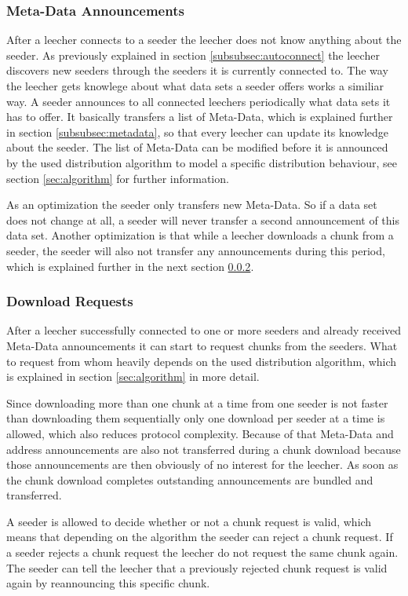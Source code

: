 \subsubsection{Meta-Data Announcements}
After a leecher connects to a seeder the leecher does not know anything about the seeder. As previously explained in section \ref{subsubsec:autoconnect} the leecher discovers new seeders through the seeders it is currently connected to. The way the leecher gets knowlege about what data sets a seeder offers works a similiar way. A seeder announces to all connected leechers periodically what data sets it has to offer. It basically transfers a list of Meta-Data, which is explained further in section \ref{subsubsec:metadata}, so that every leecher can update its knowledge about the seeder. The list of Meta-Data can be modified before it is announced by the used distribution algorithm to model a specific distribution behaviour, see section \ref{sec:algorithm} for further information.

As an optimization the seeder only transfers new Meta-Data. So if a data set does not change at all, a seeder will never transfer a second announcement of this data set. Another optimization is that while a leecher downloads a chunk from a seeder, the seeder will also not transfer any announcements during this period, which is explained further in the next section \ref{subsubsec:downloadreq}.


\subsubsection{Download Requests}
\label{subsubsec:downloadreq}
After a leecher successfully connected to one or more seeders and already received Meta-Data announcements it can start to request chunks from the seeders. What to request from whom heavily depends on the used distribution algorithm, which is explained in section \ref{sec:algorithm} in more detail. 

Since downloading more than one chunk at a time from one seeder is not faster than downloading them sequentially only one download per seeder at a time is allowed, which also reduces protocol complexity. Because of that Meta-Data and address announcements are also not transferred during a chunk download because those announcements are then obviously of no interest for the leecher. As soon as the chunk download completes outstanding announcements are bundled and transferred.

A seeder is allowed to decide whether or not a chunk request is valid, which means that depending on the algorithm the seeder can reject a chunk request. If a seeder rejects a chunk request the leecher do not request the same chunk again. The seeder can tell the leecher that a previously rejected chunk request is valid again by reannouncing this specific chunk.


